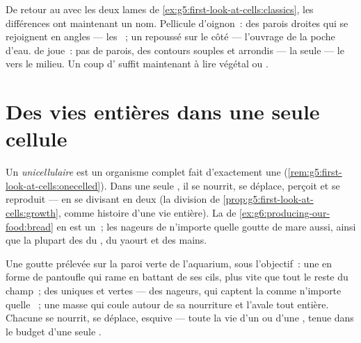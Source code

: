 \begin{example}\label{ex:g6:cell-unit-of-life:slides}
De retour au  avec les deux lames de
\cref{ex:g5:first-look-at-cells:classics}, les différences ont
maintenant un nom. Pellicule d'oignon~: des parois droites qui se
rejoignent en angles --- les ~; un  repoussé
sur le côté --- l'ouvrage de la poche d'eau.  de joue~: pas
de parois, des contours souples et arrondis --- la  seule
--- le  vers le milieu. Un coup d' suffit maintenant à lire
végétal ou .
\end{example}

\section{Des vies entières dans une seule cellule}

\begin{definition}\label{def:g6:cell-unit-of-life:unicellular}
Un  \emph{unicellulaire} est un
organisme complet fait d'exactement une 
(\cref{rem:g5:first-look-at-cells:onecelled}). Dans une seule
, il se nourrit, se déplace, perçoit et se reproduit --- en
se divisant en deux (la division de
\cref{prop:g5:first-look-at-cells:growth}, comme histoire d'une vie
entière). La  de
\cref{ex:g6:producing-our-food:bread} en est un~; les nageurs de
n'importe quelle goutte de mare aussi, ainsi que la plupart des
 du , du yaourt et des mains.
\end{definition}

\begin{example}\label{ex:g6:cell-unit-of-life:drop}
Une goutte prélevée sur la paroi verte de l'aquarium, sous
l'objectif~: une  en forme de pantoufle qui rame en battant
de ses cils, plus vite que tout le reste du champ~; des 
uniques et vertes --- des  nageurs, qui captent la
 comme n'importe quelle ~; une masse qui coule autour
de sa nourriture et l'avale tout entière. Chacune se nourrit, se
déplace, esquive --- toute la vie d'un  ou d'une , tenue
dans le budget d'une seule .
\end{example}

